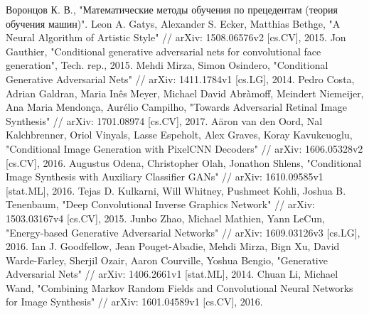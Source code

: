 \documentclass[a4paper]{article}
\begin{document}
	\renewcommand\refname{\centering СПИСОК ИСПОЛЬЗОВАННЫХ ИСТОЧНИКОВ}
	
	\setcounter{page}{2}
	\tableofcontents
	
	
	
	
	
	
	
	
	
	
	\begin{thebibliography}{99}
		  Воронцов К. В., "Математические методы обучения по прецедентам (теория обучения машин)".
		 Leon A. Gatys, Alexander S. Ecker, Matthias Bethge, "A Neural Algorithm of Artistic Style" // arXiv: 1508.06576v2 [cs.CV], 2015.
		 Jon Gauthier, "Conditional generative adversarial nets for convolutional face generation", Tech. rep., 2015.
		 Mehdi Mirza, Simon Osindero, "Conditional Generative Adversarial Nets" // arXiv: 1411.1784v1 [cs.LG], 2014.
		 Pedro Costa, Adrian Galdran, Maria Inês Meyer, Michael David Abràmoff, Meindert Niemeijer, Ana Maria Mendonça, Aurélio Campilho, "Towards Adversarial Retinal Image Synthesis" // arXiv: 1701.08974 [cs.CV], 2017.
		 A\"aron van den Oord, Nal Kalchbrenner, Oriol Vinyals, Lasse Espeholt, Alex Graves, Koray Kavukcuoglu, "Conditional Image Generation with PixelCNN Decoders" // arXiv: 1606.05328v2 [cs.CV], 2016.
		 Augustus Odena, Christopher Olah, Jonathon Shlens, "Conditional Image Synthesis with Auxiliary Classifier GANs" // arXiv: 1610.09585v1 [stat.ML], 2016.
		 Tejas D. Kulkarni, Will Whitney, Pushmeet Kohli, Joshua B. Tenenbaum, "Deep Convolutional Inverse Graphics Network" // arXiv: 1503.03167v4 [cs.CV], 2015.
		 Junbo Zhao, Michael Mathien, Yann LeCun, "Energy-based Generative Adversarial Networks" // arXiv: 1609.03126v3 [cs.LG], 2016.
		 Ian J. Goodfellow, Jean Pouget-Abadie, Mehdi Mirza, Bign Xu, David Warde-Farley, Sherjil Ozair, Aaron Courville, Yoshua Bengio, "Generative Adversarial Nets" // arXiv: 1406.2661v1 [stat.ML], 2014.
		 Chuan Li, Michael Wand, "Combining Markov Random Fields and Convolutional Neural Networks for Image Synthesis" // arXiv: 1601.04589v1 [cs.CV], 2016.

\end{thebibliography}
\end{document}
